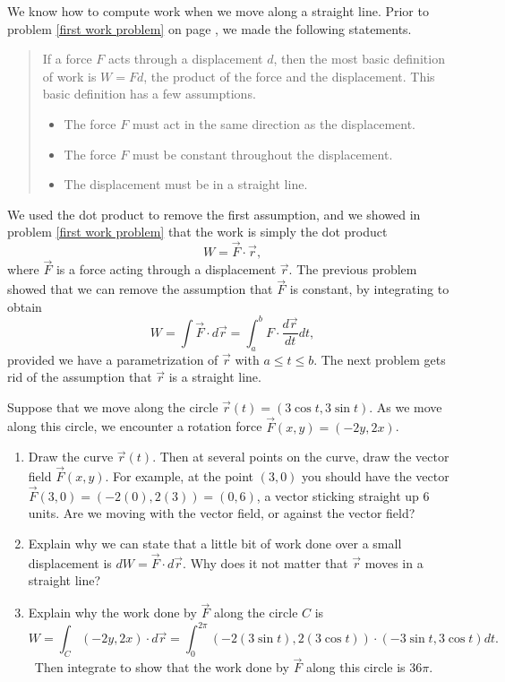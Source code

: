 We know how to compute work when we move along a straight line. Prior to problem \ref{first work problem} on page \pageref{first work problem}, we made the following statements. 
\begin{quote}If a force $F$ acts through a displacement $d$, then the most basic definition of work is $W=Fd$, the product of the force and the displacement.  This basic definition has a few assumptions.
\begin{itemize}
\item The force $F$ must act in the same direction as the displacement.
\item The force $F$ must be constant throughout the  displacement.
\item The displacement must be in a straight line.
\end{itemize}
\end{quote}
We used the dot product to remove the first assumption, and we showed in problem \ref{first work problem} that the work is simply the dot product $$W=\vec F\cdot \vec r,$$
where $\vec F$ is a force acting through a displacement $\vec r$. The previous problem showed that we can remove the assumption that $\vec F$ is constant, by integrating to obtain $$W=\int \vec F \cdot d\vec r = \int_a^b F\cdot \frac{d\vec r}{dt}dt, $$ provided we have a parametrization of $\vec r$ with $a\leq t\leq b$. The next problem gets rid of the assumption that $\vec r$ is a straight line.  

\begin{problem}
%
 Suppose that we move along the circle $\vec r(t) = (3\cos t,3\sin t)$. As we move along this circle, we encounter a rotation force $\vec F(x,y) = (-2y,2x)$.
\begin{enumerate}
 \item Draw the curve $\vec r(t)$. Then at several points on the curve, draw the vector field $\vec F(x,y)$.  For example, at the point $(3,0)$ you should have the vector $\vec F(3,0)=(-2(0),2(3))=(0,6)$, a vector sticking straight up 6 units. Are we moving with the vector field, or against the vector field?
 \item Explain why we can state that a little bit of work done over a small displacement is $dW = \vec F\cdot d\vec r$. Why does it not matter that $\vec r$ moves in a straight line? 
 \item Explain why the work done by $\vec F$ along the circle $C$ is 
$$W = \int_C\left(-2y,2x\right)\cdot d\vec r
= \int_0^{2\pi}\left(-2(3\sin t),2(3\cos t)\right)\cdot(-3\sin t, 3\cos t)dt.$$\
 Then integrate to show that the work done by $\vec F$ along this circle is $36\pi$.  
\end{enumerate}
 
\end{problem}

